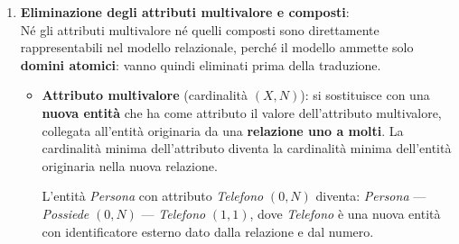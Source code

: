 \documentclass[a4paper,twoside]{article}
\begin{document}
\begin{enumerate}
\begin{itemize}
      \item Partizionamento di relazioni:\\
        Si realizza sostituendo una relazione \( R \)  con due
        relazioni distinte \( R_1 \)  e \( R_2 \), dove le occorrenze di \( R \)  si
        partizionano tra \( R_1 \)  e \( R_2 \).
        È conveniente quando esistono operazioni che si
        riferiscono ad un sottoinsieme delle occorrenze di
        \( R \)  e altre operazioni che si riferiscono alle altre
        occorrenze di \( R \).
    \end{itemize}

  \item \textbf{Eliminazione degli attributi multivalore e composti}:\\
    Né gli attributi multivalore né quelli composti sono direttamente
    rappresentabili nel modello relazionale, perché il modello ammette solo
    \textbf{domini atomici}: vanno quindi eliminati prima della traduzione.
    \begin{itemize}
      \item \textbf{Attributo multivalore} (cardinalità \( (X,N) \)):
        si sostituisce con una \textbf{nuova entità} che ha come attributo il
        valore dell'attributo multivalore, collegata all'entità originaria da una
        \textbf{relazione uno a molti}. La cardinalità minima dell'attributo
        diventa la cardinalità minima dell'entità originaria nella nuova relazione.
        \begin{example}
          L'entità \textit{Persona} con attributo \textit{Telefono} \( (0,N) \)
          diventa: \textit{Persona} --- \textit{Possiede} \( (0,N) \) ---
          \textit{Telefono} \( (1,1) \), dove \textit{Telefono} è una nuova entità
          con identificatore esterno dato dalla relazione e dal numero.
        \end{example}


\end{itemize}
\end{enumerate}
\end{document}
